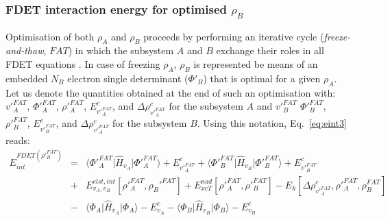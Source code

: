 \documentclass[amsmath,amssymb,preprint,aip,jcp]{revtex4-1}
\begin{document}
\subsubsection{FDET interaction energy for optimised $\rho_B$}
Optimisation of both $\rho_A$ and $\rho_B$ proceeds by performing an iterative cycle (\textit{freeze-and-thaw}, $FAT$) in which the
subsystem $A$ and $B$ exchange their roles in all FDET equations \cite{Wesolowski1996a}. 
In case of freezing $\rho_A$, $\rho_B$ is represented be means of an embedded $N_B$ electron single determinant ($\Phi'_B$) that is optimal for a given $\rho_A$. Let us denote the quantities obtained at the end of such an optimisation with: $v'^{FAT}_A$, $\Phi'^{FAT}_A$, $\rho'^{FAT}_A$, 
 $E^{c}_{v'^{FAT}_A}$, and $\Delta \rho^{c}_{v'^{FAT}_A}$ for the subsystem $A$ and
 $v'^{FAT}_B$ $\Phi'^{FAT}_B$, $\rho'^{FAT}_B$, 
 $E^{c}_{v'^{FAT}_B}$, and $\Delta \rho^{c}_{v'^{FAT}_A}$ for the subsystem $B$. Using this notation, Eq.~\ref{eq:eint3} reads: 
 \begin{eqnarray}
E_{int}^{FDET(\rho'^{FAT}_B)} 
&=& \langle\Phi'^{FAT}_{A}\vert \hat{H}_{v_A}\vert \Phi'^{FAT}_{A}\rangle + E^{c}_{v'^{FAT}_A} + \langle\Phi'^{FAT}_{B}\vert \hat{H}_{v_B}\vert \Phi'^{FAT}_{B}\rangle + E^{c}_{v'^{FAT}_B} \label{eq:eint4A}\\ \nonumber
&+& E^{elst,int}_{v_A,v_B}[\rho'^{FAT}_A,\rho_B'^{FAT}] + {E}_{xcT}^{nad}[\rho'^{FAT}_A,\rho'^{FAT}_B]- E_k[\Delta \rho^{c}_{v'^{FAT}_A}, \rho'^{FAT}_A, \rho^{FAT}_B] \nonumber\\
&-& 
\langle\Phi_{A}\vert \hat{H}_{v_A}\vert \Phi_{A}\rangle - E^{c}_{v_A}
- \langle\Phi_{B}\vert \hat{H}_{v_B}\vert \Phi_{B}\rangle - E^{c}_{v_B}\nonumber
\end{eqnarray}
\end{document}

